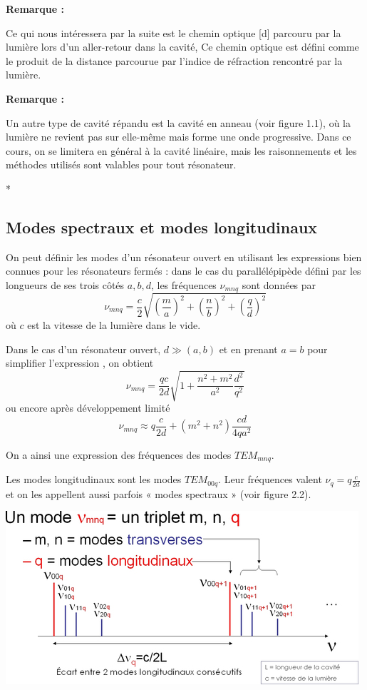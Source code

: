 \documentclass{book}
\begin{document}
\textbf{\color{remarque1}Remarque :}  
\begin{mdframed}[linecolor=remarque1, backgroundcolor=remarque2]
Ce qui nous intéressera par la suite est le chemin optique [d] parcouru par la lumière lors d'un aller-retour dans la cavité, Ce chemin optique est défini comme le produit de la distance parcourue par l'indice de réfraction rencontré par la lumière.
\end{mdframed}
\textbf{\color{remarque1}Remarque :}  
\begin{mdframed}[linecolor=remarque1, backgroundcolor=remarque2]
Un autre type de cavité répandu est la cavité en anneau (voir figure 1.1), où la lumière ne revient pas sur elle-même mais forme une onde progressive. Dans ce cours, on se limitera en général à la cavité linéaire, mais les raisonnements et les méthodes utilisés sont valables pour tout résonateur.
\end{mdframed}*

\subsection{Modes spectraux et modes longitudinaux}

On peut définir les modes d'un résonateur ouvert en utilisant les expressions bien connues pour les résonateurs fermés : dans le cas du parallélépipède défini par les longueurs de ses trois côtés $a, b, d$, les fréquences $\nu_{mnq}$ sont données par $$\nu_{mnq} = \frac c 2 \sqrt{\left( \frac m a \right) ^2 + \left(
            \frac n b \right) ^2 + \left( \frac q d \right) ^2}$$
où $c$ est la vitesse de la lumière dans le vide.

Dans le cas d'un résonateur ouvert, $d\gg (a,b)$
et en prenant $a=b$ pour simplifier l'expression , on obtient $$\nu_{mnq} = \frac {qc}{2d} \sqrt{1+\frac {n^2 + m^2}{a^2} \frac{d^2}{q^2} }$$
ou encore après développement limité $$\nu_{mnq} \approx q \frac {c}{2d} + (m^2 + n^2) \frac{cd}{4qa^2}$$

On a ainsi une expression des fréquences des modes $TEM_{mnq}$.

Les modes longitudinaux sont les modes $TEM_{00q}$. Leur fréquences valent $\nu_q = q \frac c {2d}$ et on les appellent aussi parfois « modes spectraux » (voir figure 2.2).

{\centering
\includegraphics[scale=1.7]{images/fig02.jpg}
\par}
\end{document}
